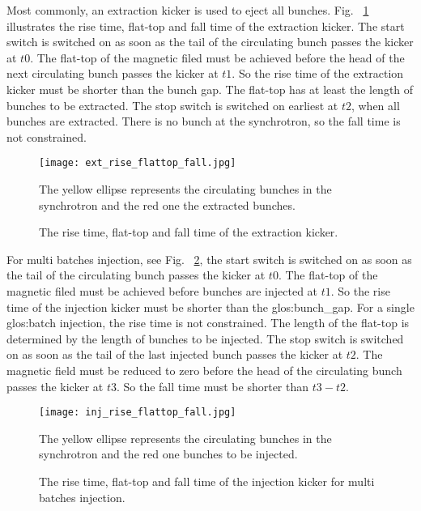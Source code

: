 
Most commonly, an extraction kicker is used to eject all bunches. Fig. ~\ref{ext_rise_flattop_fall} illustrates the rise time, flat-top and fall time of the extraction kicker. The start switch is switched on as soon as the tail of the circulating bunch passes the kicker at $t0$. The flat-top of the magnetic filed must be achieved before the head of the next circulating bunch passes the kicker at $t1$. So the rise time of the extraction kicker must be shorter than the bunch gap. The flat-top has at least the length of bunches to be extracted. The stop switch is switched on earliest at $t2$, when all bunches are extracted. There is no bunch at the synchrotron, so the fall time is not constrained. 

\begin{figure}[!htb]
   \centering   
   \texttt{[image: ext\_rise\_flattop\_fall.jpg]}
   \caption{The rise time, flat-top and fall time of the extraction kicker.}{The yellow ellipse represents the circulating bunches in the synchrotron and the red one the extracted bunches.}
   \label{ext_rise_flattop_fall}
\end{figure}
 
For multi batches injection, see Fig. ~\ref{inj_rise_flattop_fall}, the start switch is switched on as soon as the tail of the circulating bunch passes the kicker at $t0$. The flat-top of the magnetic filed must be achieved before bunches are injected at $t1$. So the rise time of the injection kicker must be shorter than the \gls{glos:bunch_gap}. For a single \gls{glos:batch} injection, the rise time is not constrained. The length of the flat-top is determined by the length of bunches to be injected. The stop switch is switched on as soon as the tail of the last injected bunch passes the kicker at $t2$. The magnetic field must be reduced to zero before the head of the circulating bunch passes the kicker at $t3$. So the fall time must be shorter than $t3-t2$.

\begin{figure}[!htb]
   \centering   
   \texttt{[image: inj\_rise\_flattop\_fall.jpg]}
   \caption{The rise time, flat-top and fall time of the injection kicker for multi batches injection.}{The yellow ellipse represents the circulating bunches in the synchrotron and the red one bunches to be injected.}
   \label{inj_rise_flattop_fall}
\end{figure}

%


%
%


